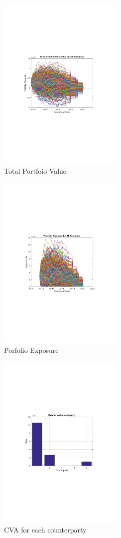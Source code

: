 \documentclass{amsart}
\theoremstyle{definition}\newtheorem{definition}[theorem]{Definition}
\theoremstyle{remark}\newtheorem{remark}[theorem]{Remark}
\begin{document}
\begin{figure}[!htbp]
  \centering 
	\includegraphics[width=6cm, clip, trim= 110 270 110 270]{IMG/TotalPortfoioValue.pdf}
  \caption{Total Portfoio Value}  \label{TotalPortfoioValue}
\end{figure}

\begin{figure}[!htbp]
  \centering 
	\includegraphics[width=6cm, clip, trim= 110 270 110 270]{IMG/PorfolioExposure.pdf}
  \caption{Porfolio Exposure}  \label{PorfolioExposure}
\end{figure}

\begin{figure}[!htbp]
  \centering 
	\includegraphics[width=6cm, clip, trim= 110 270 110 270]{IMG/CVAforEachCounterparty.pdf}
  \caption{CVA for each counterparty}  \label{CVAforEachCounterparty}
\end{figure}
\end{document}
